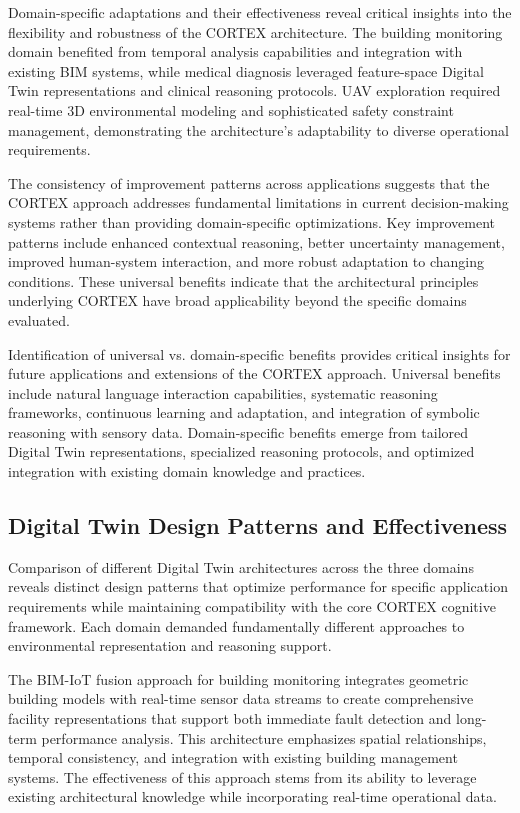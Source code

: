 Domain-specific adaptations and their effectiveness reveal critical insights into the flexibility and robustness of the CORTEX architecture. The building monitoring domain benefited from temporal analysis capabilities and integration with existing BIM systems, while medical diagnosis leveraged feature-space Digital Twin representations and clinical reasoning protocols. UAV exploration required real-time 3D environmental modeling and sophisticated safety constraint management, demonstrating the architecture's adaptability to diverse operational requirements.

The consistency of improvement patterns across applications suggests that the CORTEX approach addresses fundamental limitations in current decision-making systems rather than providing domain-specific optimizations. Key improvement patterns include enhanced contextual reasoning, better uncertainty management, improved human-system interaction, and more robust adaptation to changing conditions. These universal benefits indicate that the architectural principles underlying CORTEX have broad applicability beyond the specific domains evaluated.

Identification of universal vs. domain-specific benefits provides critical insights for future applications and extensions of the CORTEX approach. Universal benefits include natural language interaction capabilities, systematic reasoning frameworks, continuous learning and adaptation, and integration of symbolic reasoning with sensory data. Domain-specific benefits emerge from tailored Digital Twin representations, specialized reasoning protocols, and optimized integration with existing domain knowledge and practices.

\subsection{Digital Twin Design Patterns and Effectiveness}

Comparison of different Digital Twin architectures across the three domains reveals distinct design patterns that optimize performance for specific application requirements while maintaining compatibility with the core CORTEX cognitive framework. Each domain demanded fundamentally different approaches to environmental representation and reasoning support.

The BIM-IoT fusion approach for building monitoring integrates geometric building models with real-time sensor data streams to create comprehensive facility representations that support both immediate fault detection and long-term performance analysis. This architecture emphasizes spatial relationships, temporal consistency, and integration with existing building management systems. The effectiveness of this approach stems from its ability to leverage existing architectural knowledge while incorporating real-time operational data.

